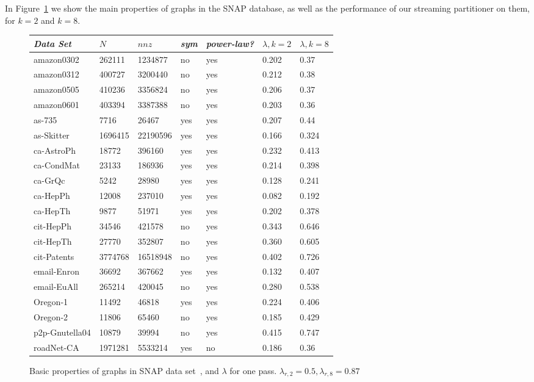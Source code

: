 In Figure~\ref{table:big} we show the main properties of graphs in the SNAP database, as well as the performance of our streaming partitioner on them, for $k=2$ and $k=8$. 

\begin{figure}
\caption{Basic properties of graphs in SNAP data set~\cite{Leskovec-data}, and $\lambda$ for one pass. $\lambda_{r,2}=0.5,\lambda_{r,8}=0.87$}
\centering
{ \begin{tabular}{ *7l }    \toprule
\label{table:big}
\emph{Data Set} & $N$ & $nnz$ & \emph{sym} & \emph{power-law?} & $\lambda, k=2$ & $\lambda, k=8$ \\\midrule 
amazon0302 & 262111 & 1234877 & no & yes & 0.202&0.37\\ 
amazon0312 & 400727 & 3200440 & no & yes & 0.212&0.38\\ 
amazon0505 & 410236 & 3356824 & no & yes & 0.206&0.37\\ 
amazon0601 & 403394 & 3387388 & no & yes & 0.203&0.36\\ 
as-735 & 7716 & 26467 & yes & yes & 0.207&0.44\\ 
as-Skitter & 1696415 & 22190596 & yes & yes & 0.166&0.324\\ 
ca-AstroPh & 18772 & 396160 & yes & yes & 0.232&0.413\\ 
ca-CondMat & 23133 & 186936 & yes & yes & 0.214&0.398\\ 
ca-GrQc & 5242 & 28980 & yes & yes & 0.128&0.241\\ 
ca-HepPh & 12008 & 237010 & yes & yes & 0.082&0.192\\ 
ca-HepTh & 9877 & 51971 & yes & yes & 0.202&0.378\\ 
cit-HepPh & 34546 & 421578 & no & yes & 0.343&0.646\\ 
cit-HepTh & 27770 & 352807 & no & yes & 0.360&0.605\\ 
cit-Patents & 3774768 & 16518948 & no & yes & 0.402&0.726\\ 
email-Enron & 36692 & 367662 & yes & yes & 0.132&0.407\\ 
email-EuAll & 265214 & 420045 & no & yes & 0.280&0.538\\ 
Oregon-1 & 11492 & 46818 & yes & yes & 0.224&0.406\\ 
Oregon-2 & 11806 & 65460 & no & yes & 0.185&0.429\\ 
p2p-Gnutella04 & 10879 & 39994 & no & yes & 0.415&0.747\\ 
roadNet-CA & 1971281 & 5533214 & yes & no & 0.186&0.36\\ 

\end{tabular}}
\end{figure}
